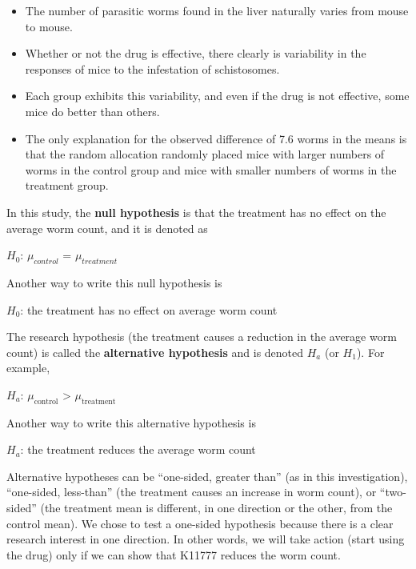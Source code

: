 \documentclass[
]{book}
\providecommand{\tightlist}{%
  \setlength{\itemsep}{0pt}\setlength{\parskip}{0pt}}
\begin{document}
\begin{itemize}
\tightlist
\item
  The number of parasitic worms found in the liver naturally varies from mouse to mouse.
\item
  Whether or not the drug is effective, there clearly is variability in the responses of mice to the infestation
  of schistosomes.
\item
  Each group exhibits this variability, and even if the drug is not effective, some mice do better than
  others.
\item
  The only explanation for the observed difference of 7.6 worms in the means is that the random
  allocation randomly placed mice with larger numbers of worms in the control group and mice with
  smaller numbers of worms in the treatment group.
\end{itemize}

In this study, the \textbf{null hypothesis} is that the treatment has no effect on the average worm count, and it
is denoted as

\begin{center}
$H_0$: $\mu_{control}$ = $\mu_{treatment}$
\end{center}

Another way to write this null hypothesis is

\begin{center}
$H_0$: the treatment has no effect on average worm count
\end{center}

The research hypothesis (the treatment causes a reduction in the average worm count) is called the \textbf{alternative hypothesis} and is denoted \(H_a\) (or \(H_1\)). For example,

\begin{center}
$H_a$: $\mu_{\text{control}}$ > $\mu_{\text{treatment}}$
\end{center}

Another way to write this alternative hypothesis is

\begin{center}
$H_a$: the treatment reduces the average worm count
\end{center}

Alternative hypotheses can be ``one-sided, greater than'' (as in this investigation), ``one-sided, less-than'' (the treatment causes an increase in worm count), or ``two-sided'' (the treatment mean is different, in one direction or the other, from the control mean). We chose to test a one-sided hypothesis because there is a clear research interest in one direction. In other words, we will take action (start using the drug) only if we can show that K11777 reduces the worm count.
\end{document}
